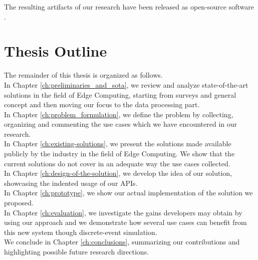 The resulting artifacts of our research have been released as open-source software \cite{thesis-github}.


\section{Thesis Outline}
The remainder of this thesis is organized as follows.\\
In Chapter \ref{ch:preliminaries_and_sota}, we review and analyze state-of-the-art solutions in the field of Edge Computing, starting from surveys and general concept and then moving our focus to the data processing part.\\
In Chapter \ref{ch:problem_formulation}, we define the problem by collecting, organizing and commenting the use cases which we have encountered in our research.\\
In Chapter \ref{ch:existing-solutions}, we present the solutions made available publicly by the industry in the field of Edge Computing. We show that the current solutions do not cover in an adequate way the use cases collected.\\
In Chapter \ref{ch:design-of-the-solution}, we develop the idea of our solution, showcasing the indented usage of our APIs.\\
In Chapter \ref{ch:prototype}, we show our actual implementation of the solution we proposed.\\
In Chapter \ref{ch:evaluation}, we investigate the gains developers may obtain by using our approach and we demonstrate how several use cases can benefit from this new system though discrete-event simulation.\\
We conclude in Chapter \ref{ch:conclusions}, summarizing our contributions and highlighting possible future research directions.


